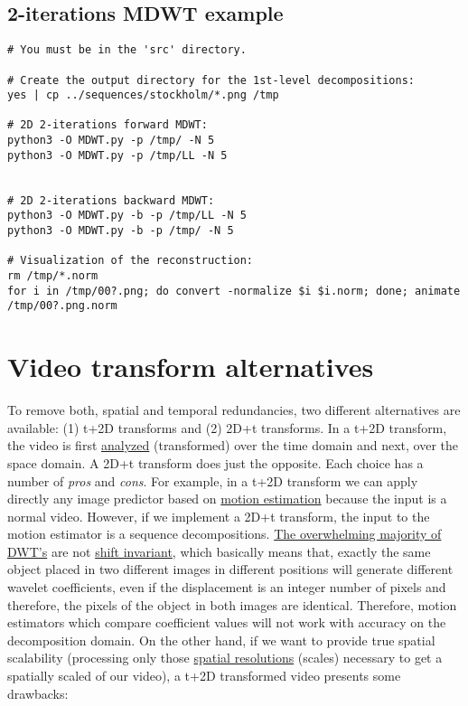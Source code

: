 \subsection{2-iterations MDWT example}
\begin{verbatim}
# You must be in the 'src' directory.

# Create the output directory for the 1st-level decompositions:
yes | cp ../sequences/stockholm/*.png /tmp

# 2D 2-iterations forward MDWT:
python3 -O MDWT.py -p /tmp/ -N 5
python3 -O MDWT.py -p /tmp/LL -N 5


# 2D 2-iterations backward MDWT:
python3 -O MDWT.py -b -p /tmp/LL -N 5
python3 -O MDWT.py -b -p /tmp/ -N 5

# Visualization of the reconstruction:
rm /tmp/*.norm
for i in /tmp/00?.png; do convert -normalize $i $i.norm; done; animate /tmp/00?.png.norm
\end{verbatim}

\section{Video transform alternatives}
To remove both, spatial and temporal redundancies, two different
alternatives are available: (1) t+2D transforms and (2) 2D+t
transforms. In a t+2D transform, the video is first
\href{https://en.wikipedia.org/wiki/Digital_filter\#Analysis_techniques}{analyzed}
(transformed) over the time domain and next, over the space domain. A
2D+t transform does just the opposite. Each choice has a number of
\emph{pros} and \emph{cons}. For example, in a t+2D transform we can
apply directly any image predictor based on
\href{https://en.wikipedia.org/wiki/Motion_estimation}{motion
  estimation} because the input is a normal video. However, if we
implement a 2D+t transform, the input to the motion estimator is a
sequence decompositions.
\href{http://www.polyvalens.com/blog/wavelets/theory}{The overwhelming
  majority of DWT's} are not
\href{http://www.polyvalens.com/blog/wavelets/theory}{shift
  invariant}, which basically means that, exactly the same object
placed in two different images in different positions will generate
different wavelet coefficients, even if the displacement is an integer
number of pixels and therefore, the pixels of the object in both
images are identical.  Therefore, motion estimators which compare
coefficient values will not work with accuracy on the decomposition
domain. On the other hand, if we want to provide true spatial
scalability (processing only those
\href{https://www.tutorialspoint.com/dip/spatial_resolution.htm}{spatial
  resolutions} (scales) necessary to get a spatially scaled of our
video), a t+2D transformed video presents some drawbacks:

